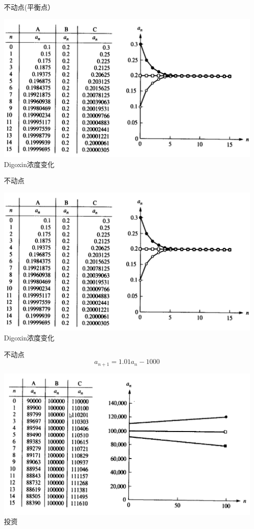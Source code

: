 \documentclass{beamer}
\begin{document}
\begin{frame}{不动点(平衡点）}
  \begin{center}
    \includegraphics[width=.8\textwidth{}]{fixedpoint.png}\\
    Digoxin浓度变化
  \end{center}
  
\end{frame}

\begin{frame}{不动点}
  \begin{center}
    \includegraphics[width=.8\textwidth{}]{fixedpoint.png}\\
    Digoxin浓度变化
  \end{center}
  
\end{frame}

\begin{frame}{不动点}
\[
a_{n+1} = 1.01a_n -1000
\]
  \begin{center}
    \includegraphics[width=.8\textwidth{}]{invest.png}\\
    投资
  \end{center}
  
\end{frame}
\end{document}
